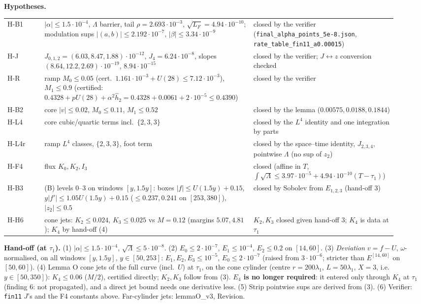 \documentclass[11pt]{article}
\begin{document}
\noindent\textbf{Hypotheses.}
\begin{center}\begin{tabular}{p{0.09\linewidth}p{0.50\linewidth}p{0.33\linewidth}}
H-B1 & $|\alpha|\le1.5\cdot10^{-4}$, $\Lambda$ barrier, tail $\rho=2.693\cdot10^{-3}$, $\sqrt{L_F}=4.94\cdot10^{-10}$; modulation sups $|(a,b)|\le2.192\cdot10^{-7}$, $|\beta|\le3.34\cdot10^{-9}$ & closed by the verifier (\texttt{final\_alpha\_points\_5e-8.json}, \texttt{rate\_table\_fin11\_a0.00015})\\
H-J & $J_{0,1,2}=(6.03,8.47,1.88)\cdot10^{-12}$, $J_4=6.24\cdot10^{-8}$, slopes $(8.64,12.2,2.69)\cdot10^{-19}$, $8.94\cdot10^{-15}$ & closed by the verifier; $J\leftrightarrow z$ conversion checked\\
H-R & ramp $M_0\le0.05$ (cert.\ $1.161\cdot10^{-3}+U(28)\le7.12\cdot10^{-3}$), $M_1\le0.9$ (certified: $0.4328+pU(28)+\alpha^2\hat h_2=0.4328+0.0061+2\cdot10^{-5}\le0.4390$) & closed by the verifier\\
H-B2 & core $|v|\le0.02$, $M_0\le0.11$, $M_1\le0.52$ & closed by the lemma ($0.00575,0.0188,0.1844$)\\
H-L4 & core cubic/quartic terms incl.\ $\{2,3,3\}$ & closed by the $L^4$ identity and one integration by parts\\
H-L4r & ramp $L^4$ classes, $\{2,3,3\}$, foot term & closed by the space--time identity, $J_{2,3,4}$, pointwise $\Lambda$ (no sup of $z_2$)\\
H-F4 & flux $K_0,K_2,I_3$ & closed (affine in $T$, $\int\sqrt\Lambda\le3.97\cdot10^{-5}+4.94\cdot10^{-10}(T-\tau_1)$)\\
H-B3 & (B) levels 0--3 on windows $[y,1.5y]$: boxes $|f|\le U(1.5y)+0.15$, $y|f'|\le1.05U(1.5y)+0.15$ ($\le0.237,0.241$ on $[253,380]$), $|z_2|\le0.5$ & closed by Sobolev from $E_{1,2,3}$ (hand-off 3)\\
H-H6 & cone jets: $K_2\le0.024$, $K_3\le0.025$ vs $M=0.12$ (margins $5.07,4.81$); $K_4$ by hand-off (4) & $K_2,K_3$ closed given hand-off 3; $K_4$ is data at $\tau_1$\\
\end{tabular}\end{center}
\noindent\textbf{Hand-off (at $\tau_1$).} (1) $|\alpha|\le1.5\cdot10^{-4}$, $\sqrt\Lambda\le5\cdot10^{-8}$. (2) $E_0\le2\cdot10^{-7}$, $E_1\le10^{-4}$, $E_2\le0.2$ on $[14,60]$. (3) \emph{Deviation} $v=f-U$, $\omega$-normalised, on all windows $[y,1.5y]$, $y\in[50,253]$: $E_1,E_2,E_3\le10^{-5}$, $E_0\le2\cdot10^{-7}$ (raised from $3\cdot10^{-6}$; stricter than $E^{[14,60]}$ on $[50,60]$). (4) Lemma O cone jets of the full curve (incl.\ $U$) at $\tau_1$, on the cone cylinder (centre $r=200\lambda_1$, $L=50\lambda_1$, $X=3$, i.e.\ $y\in[50,350]$): $K_4\le0.06$ ($M/2$), certified directly; $K_2,K_3$ follow from (3). \textbf{$E_4$ is no longer required}: it entered only through $K_4$ at $\tau_1$ (finding 6: not propagated), and a direct jet bound needs one derivative less. (5) Strip pointwise sups are derived from (3). (6) Verifier: \texttt{fin11} $J$'s and the F4 constants above. Far-cylinder jets: lemmaO\_v3, Revision.
\end{document}

